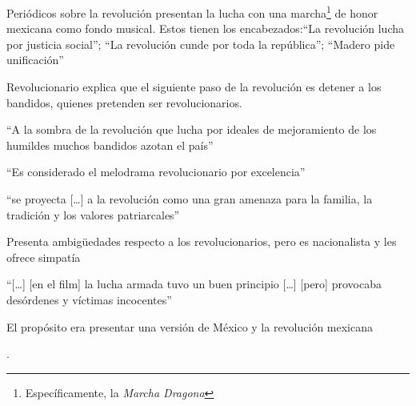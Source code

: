 \begin{compactitem}
    \item  Periódicos sobre la revolución presentan la lucha con una marcha\footnote{Específicamente, la \emph{Marcha Dragona}} de honor mexicana como fondo musical. Estos tienen los encabezados:``La revolución lucha por justicia social''; ``La revolución cunde por toda la república''; ``Madero pide unificación''\autocite[42:38-43:20]{fernandez_flor_1943}
    \item Revolucionario explica que el siguiente paso de la revolución es detener a los bandidos, quienes pretenden ser revolucionarios.\autocite[48:07-48:40]{fernandez_flor_1943}
    \item ``A la sombra de la revolución que lucha por ideales de mejoramiento de los humildes muchos bandidos azotan el país''\autocite[1:21:40]{fernandez_flor_1943}
    \item ``Es considerado el melodrama revolucionario por excelencia''\autocite[178]{guerrero_imagen_2005}
    \item ``se proyecta [\ldots] a la revolución como una gran amenaza para la familia, la tradición y los valores patriarcales''\autocite[178]{guerrero_imagen_2005}
    \item Presenta ambigüedades respecto a los revolucionarios, pero es nacionalista y les ofrece simpatía\autocite[87]{demello_unfinished_2001}
    \item ``[\ldots] [en el film] la lucha armada tuvo un buen principio [\ldots] [pero] provocaba desórdenes y víctimas incocentes''\autocite[36]{blanco_aventura_1993}
    \item El propósito era presentar una versión de México y la revolución mexicana\autocite[23:19]{soler_serrano_emilio_1976}
    \item
    \autocite[1:30:10]{fernandez_flor_1943}.
    \end{compactitem} 

